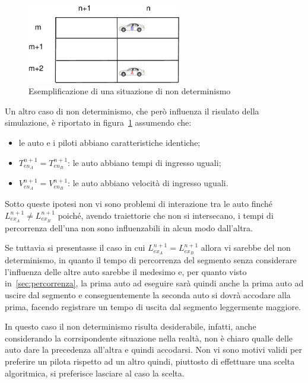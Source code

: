 \begin{figure}
\begin{center}
\includegraphics[width=0.6\textwidth]{diagrammi/NonDet}
\caption{Esemplificazione di una situazione di non determinismo}
\label{fig:nonDet}
\end{center}
\end{figure}

Un altro caso di non determinismo, che però influenza il risulato della simulazione, è riportato in figura~\ref{fig:nonDet} assumendo che:
\begin{itemize}
\item le auto e i piloti abbiano caratteristiche identiche;
\item $T_{en_A}^{n+1} = T_{en_B}^{n+1}$: le auto abbiano tempi di ingresso uguali;
\item $V_{en_A}^{n+1} = V_{en_B}^{n+1}$: le auto abbiano velocità di ingresso uguali.
\end{itemize}

Sotto queste ipotesi non vi sono problemi di interazione tra le auto finché $L_{ex_A}^{n+1} \neq L_{ex_B}^{n+1}$ poiché, avendo traiettorie che non si intersecano, i tempi di percorrenza dell'una non sono influenzabili in alcun modo dall'altra.

Se tuttavia si presentasse il caso in cui $L_{ex_A}^{n+1} = L_{ex_B}^{n+1}$ allora vi sarebbe del non determinismo, in quanto il tempo di percorrenza del segmento senza considerare l'influenza delle altre auto sarebbe il medesimo e, per quanto visto in~\ref{sec:percorrenza}, la prima auto ad eseguire sarà quindi anche la prima auto ad uscire dal segmento e conseguentemente la seconda auto si dovrà accodare alla prima, facendo registrare un tempo di uscita dal segmento leggermente maggiore.

In questo caso il non determinismo risulta desiderabile, infatti, anche considerando la corrsipondente situazione nella realtà, non è chiaro qualle delle auto dare la precedenza all'altra e quindi accodarsi.
Non vi sono motivi validi per preferire un pilota rispetto ad un altro quindi, piuttosto di effettuare una scelta algoritmica, si preferisce lasciare al caso la scelta.



